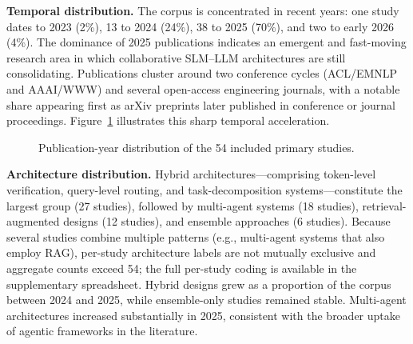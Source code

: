 \textbf{Temporal distribution.} The corpus is concentrated in recent years: one study dates to 2023 (2\%), 13 to 2024 (24\%), 38 to 2025 (70\%), and two to early 2026 (4\%). The dominance of 2025 publications indicates an emergent and fast-moving research area in which collaborative SLM--LLM architectures are still consolidating. Publications cluster around two conference cycles (ACL/EMNLP and AAAI/WWW) and several open-access engineering journals, with a notable share appearing first as arXiv preprints later published in conference or journal proceedings. Figure~\ref{fig:publication-years} illustrates this sharp temporal acceleration.

\begin{figure}[!htbp]
\centering
{}
\caption{Publication-year distribution of the 54 included primary studies.}
\label{fig:publication-years}
\end{figure}

\textbf{Architecture distribution.} Hybrid architectures---comprising token-level verification, query-level routing, and task-decomposition systems---constitute the largest group (27 studies), followed by multi-agent systems (18 studies), retrieval-augmented designs (12 studies), and ensemble approaches (6 studies). Because several studies combine multiple patterns (e.g., multi-agent systems that also employ RAG), per-study architecture labels are not mutually exclusive and aggregate counts exceed 54; the full per-study coding is available in the supplementary spreadsheet. Hybrid designs grew as a proportion of the corpus between 2024 and 2025, while ensemble-only studies remained stable. Multi-agent architectures increased substantially in 2025, consistent with the broader uptake of agentic frameworks in the literature.

